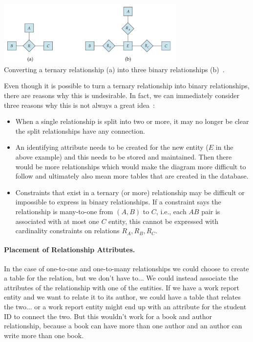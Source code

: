 \begin{center}
\includegraphics[width=0.7\textwidth]{images/ternary-to-binary}\\
Converting a ternary relationship (a) into three binary relationships (b)~\cite{dsc}.
\end{center}

Even though it is possible to turn a ternary relationship into binary relationships, there are reasons why this is undesirable. In fact, we can immediately consider three reasons why this is not always a great idea~\cite{dsc}:

\begin{itemize}
	\item When a single relationship is split into two or more, it may no longer be clear the split relationships have any connection. 
	\item An identifying attribute needs to be created for the new entity ($E$ in the above example) and this needs to be stored and maintained. Then there would be more relationships which would make the diagram more difficult to follow and ultimately also mean more tables that are created in the database.
	\item Constraints that exist in a ternary (or more) relationship may be difficult or impossible to express in binary relationships. If a constraint says the relationship is many-to-one from $(A, B)$ to $C$, i.e., each $AB$ pair is associated with at most one $C$ entity, this cannot be expressed with cardinality constraints on relations $R_{A}, R_{B}, R_{C}$.
\end{itemize}

\paragraph{Placement of Relationship Attributes.} 

In the case of one-to-one and one-to-many relationships we could choose to create a table for the relation, but we don't have to... We could instead associate the attributes of the relationship with one of the entities. If we have a work report entity and we want to relate it to its author, we could have a table that relates the two... or a work report entity might end up with an attribute for the student ID to connect the two. But this wouldn't work for a book and author relationship, because a book can have more than one author and an author can write more than one book.

